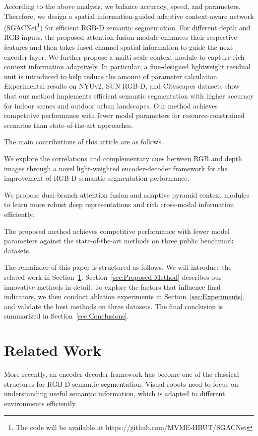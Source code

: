 \documentclass[journal,twoside,web]{ieeecolor}
\begin{document}
According to the above analysis, we balance accuracy, speed, and parameters. Therefore, we design a spatial information-guided adaptive context-aware network (SGACNet\footnote{The code will be available at https://github.com/MVME-HBUT/SGACNet}) for efficient RGB-D semantic segmentation. For different depth and RGB inputs, the proposed attention fusion module enhances their respective features and then takes fused channel-spatial information to guide the next encoder layer. We further propose a multi-scale context module to capture rich context information adaptively. In particular, a fine-designed lightweight residual unit is introduced to help reduce the amount of parameter calculation. Experimental results on NYUv2, SUN RGB-D, and Cityscapes datasets show that our method implements efficient semantic segmentation with higher accuracy for indoor scenes and outdoor urban landscapes. Our method achieves competitive performance with fewer model parameters for resource-constrained scenarios than state-of-the-art approaches.


The main contributions of this article are as follows.

 We explore the correlations and complementary cues between RGB and depth images through a novel light-weighted encoder-decoder framework for the improvement of RGB-D semantic segmentation performance.

 We propose dual-branch attention fusion and adaptive pyramid context modules to learn more robust deep representations and rich cross-modal information efficiently. 

 The proposed method achieves competitive performance with fewer model parameters against the state-of-the-art methods on three public benchmark datasets.

The remainder of this paper is structured as follows. We will introduce the related work in Section~\ref{sec:Related Work}. Section~\ref{sec:Proposed Method} describes our innovative methods in detail. To explore the factors that influence final indicators, we then conduct ablation experiments in Section~\ref{sec:Experiments}, and validate the best methods on three datasets. The final conclusion is summarized in Section~\ref{sec:Conclusions}.


\section{Related Work}\label{sec:Related Work}
More recently, an encoder-decoder framework has become one of the classical structures for RGB-D semantic segmentation. Visual robots need to focus on understanding useful semantic information, which is adapted to different environments efficiently. 
\end{document}
